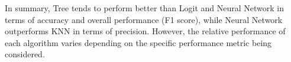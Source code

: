 \documentclass{article}
\begin{document}
In summary, Tree tends to perform better than Logit and Neural Network in terms of accuracy and overall performance (F1 score), while Neural Network outperforms KNN in terms of precision. However, the relative performance of each algorithm varies depending on the specific performance metric being considered.
\end{document}
